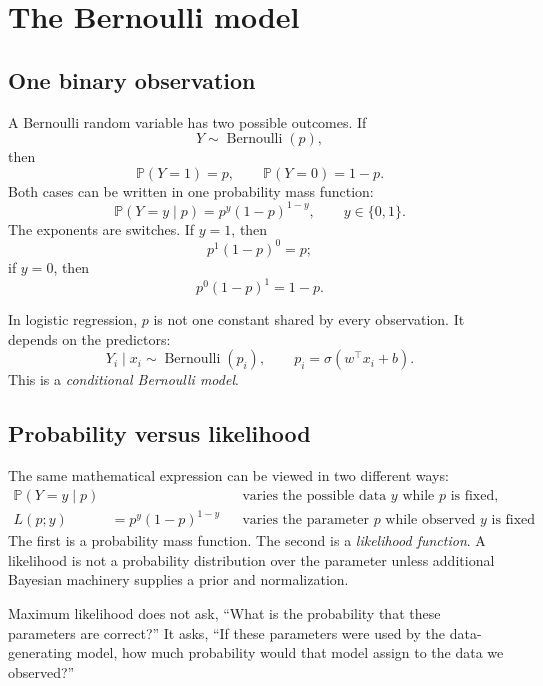 \documentclass[11pt]{article}
\newcommand{\Prob}{\mathbb{P}}
\newcommand{\sigmoid}{\sigma}
\theoremstyle{definition}
\begin{document}
\section{The Bernoulli model}

\subsection{One binary observation}

A Bernoulli random variable has two possible outcomes. If
\[
Y\sim\operatorname{Bernoulli}(p),
\]
then
\[
\Prob(Y=1)=p,
\qquad
\Prob(Y=0)=1-p.
\]
Both cases can be written in one probability mass function:
\begin{equation}
\boxed{\Prob(Y=y\mid p)=p^y(1-p)^{1-y}},
\qquad y\in\{0,1\}.
\label{eq:bernoulli-pmf}
\end{equation}
The exponents are switches. If $y=1$, then
\[
p^1(1-p)^0=p;
\]
if $y=0$, then
\[
p^0(1-p)^1=1-p.
\]

In logistic regression, $p$ is not one constant shared by every observation. It depends on the predictors:
\[
Y_i\mid x_i\sim\operatorname{Bernoulli}(p_i),
\qquad p_i=\sigmoid(w^\top x_i+b).
\]
This is a \emph{conditional Bernoulli model}.

\subsection{Probability versus likelihood}

The same mathematical expression can be viewed in two different ways:
\begin{align*}
\Prob(Y=y\mid p)& &&\text{varies the possible data $y$ while $p$ is fixed},\\
L(p;y)&=p^y(1-p)^{1-y} &&\text{varies the parameter $p$ while observed $y$ is fixed}.
\end{align*}
The first is a probability mass function. The second is a \emph{likelihood function}. A likelihood is not a probability distribution over the parameter unless additional Bayesian machinery supplies a prior and normalization.

\begin{warningbox}
Maximum likelihood does not ask, ``What is the probability that these parameters are correct?'' It asks, ``If these parameters were used by the data-generating model, how much probability would that model assign to the data we observed?''
\end{warningbox}
\end{document}
